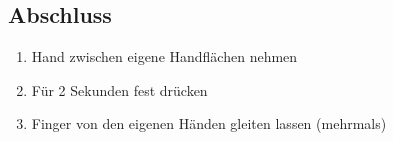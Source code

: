 \subsection{Abschluss}
\begin{enumerate}
\item Hand zwischen eigene Handflächen nehmen
\item Für 2 Sekunden fest drücken
\item Finger von den eigenen Händen gleiten lassen (mehrmals)
\end{enumerate}
